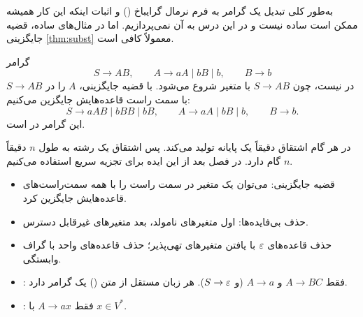 به‌طور کلی تبدیل یک گرامر به فرم نرمال گرایباخ () و اثبات اینکه این کار همیشه ممکن است ساده نیست و در این درس به آن نمی‌پردازیم. اما در مثال‌های ساده، قضیه جایگزینی \ref{thm:subst} معمولاً کافی است.

\begin{example}
گرامر
\[S\to AB,\qquad A\to aA\mid bB\mid b,\qquad B\to b\]
در  نیست، چون $S\to AB$ با متغیر شروع می‌شود. با قضیه جایگزینی، $A$ را در $S\to AB$ با سمت راست قاعده‌هایش جایگزین می‌کنیم:
\[S\to aAB\mid bBB\mid bB,\qquad A\to aA\mid bB\mid b,\qquad B\to b.\]
این گرامر در  است.
\end{example}

\begin{note}
در  هر گام اشتقاق دقیقاً یک پایانه تولید می‌کند. پس اشتقاق یک رشته به طول $n$ دقیقاً $n$ گام دارد. در فصل بعد از این ایده برای تجزیه سریع استفاده می‌کنیم.
\end{note}

\begin{summary}
\begin{itemize}
\item قضیه جایگزینی: می‌توان یک متغیر در سمت راست را با همه سمت‌راست‌های قاعده‌هایش جایگزین کرد.
\item حذف بی‌فایده‌ها: اول متغیرهای نامولد، بعد متغیرهای غیرقابل دسترس.
\item حذف قاعده‌های $\varepsilon$ با یافتن متغیرهای تهی‌پذیر؛ حذف قاعده‌های واحد با گراف وابستگی.
\item {}: فقط $A\to BC$ و $A\to a$ (و $S\to\varepsilon$). هر زبان مستقل از متن () یک گرامر  دارد.
\item {}: فقط $A\to ax$ با $x\in V^*$.
\end{itemize}
\end{summary}
